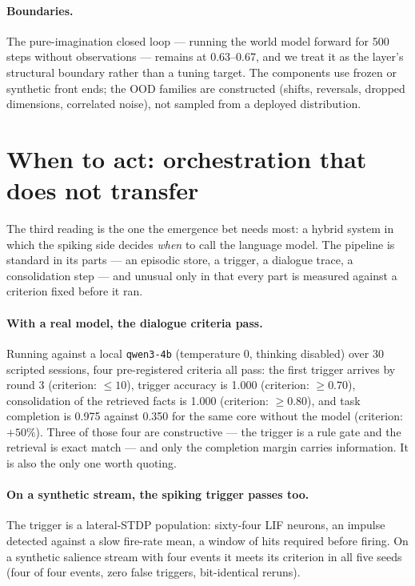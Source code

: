 \documentclass[11pt]{article}
\begin{document}
\paragraph{Boundaries.} The pure-imagination closed loop --- running the world
model forward for 500 steps without observations --- remains at 0.63--0.67, and we
treat it as the layer's structural boundary rather than a tuning target. The
components use frozen or synthetic front ends; the OOD families are constructed
(shifts, reversals, dropped dimensions, correlated noise), not sampled from a
deployed distribution.

\section{When to act: orchestration that does not transfer}
\label{sec:when-to-act}

The third reading is the one the emergence bet needs most: a hybrid system in which
the spiking side decides \emph{when} to call the language model. The pipeline is
standard in its parts --- an episodic store, a trigger, a dialogue trace, a
consolidation step --- and unusual only in that every part is measured against a
criterion fixed before it ran.

\paragraph{With a real model, the dialogue criteria pass.} Running against a local
\texttt{qwen3-4b} (temperature 0, thinking disabled) over 30 scripted sessions, four
pre-registered criteria all pass: the first trigger arrives by round 3 (criterion:
$\leq 10$), trigger accuracy is 1.000 (criterion: $\geq 0.70$), consolidation of
the retrieved facts is 1.000 (criterion: $\geq 0.80$), and task completion is
0.975 against 0.350 for the same core without the model (criterion: $+50\%$). Three
of those four are constructive --- the trigger is a rule gate and the retrieval is
exact match --- and only the completion margin carries information. It is also the
only one worth quoting.

\paragraph{On a synthetic stream, the spiking trigger passes too.} The trigger is a
lateral-STDP population: sixty-four LIF neurons, an impulse detected against a slow
fire-rate mean, a window of hits required before firing. On a synthetic salience
stream with four events it meets its criterion in all five seeds (four of four
events, zero false triggers, bit-identical reruns).
\end{document}
